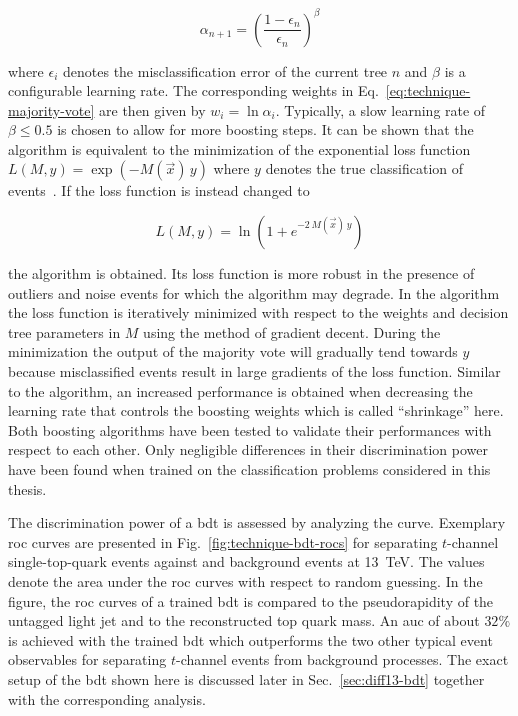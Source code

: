 \begin{equation}
\alpha_{n+1}=\left(\frac{1-\epsilon_{n}}{\epsilon_{n}}\right)^\beta
\end{equation}

where $\epsilon_{i}$ denotes the misclassification error of the current tree $n$ and $\beta$ is a configurable learning rate. The corresponding weights in Eq.~\ref{eq:technique-majority-vote} are then given by $w_{i}=\ln\alpha_{i}$. Typically, a slow learning rate of $\beta\leq0.5$ is chosen to allow for more boosting steps. It can be shown that the \ADABOOST algorithm is equivalent to the minimization of the exponential loss function $L(M,y)=\exp(-M(\vec{x})\,y)$ where $y$ denotes the true classification of events~\cite{Hocker:2007ht}. If the loss function is instead changed to 

\begin{equation}
L(M,y)=\ln\left(1+e^{-2\,M(\vec{x})\,y}\right)
\end{equation}

the \GRADIENTBOOST algorithm is obtained. Its loss function is more robust in the presence of outliers and noise events for which the \ADABOOST algorithm may degrade. In the \GRADIENTBOOST algorithm the loss function is iteratively minimized with respect to the weights and decision tree parameters in $M$ using the method of gradient decent. During the minimization the output of the majority vote will gradually tend towards $y$ because misclassified events result in large gradients of the loss function. Similar to the \ADABOOST algorithm, an increased performance is obtained when decreasing the learning rate that controls the boosting weights which is called ``shrinkage'' here. Both boosting algorithms have been tested to validate their performances with respect to each other. Only negligible differences in their discrimination power have been found when trained on the classification problems considered in this thesis.

The discrimination power of a \gls{bdt} is assessed by analyzing the  curve. Exemplary \gls{roc} curves are presented in Fig.~\ref{fig:technique-bdt-rocs} for separating $t$-channel single-top-quark events against \wjets and \ttbar background events at 13~TeV. The  values denote the area under the \gls{roc} curves with respect to random guessing. In the figure, the \gls{roc} curves of a trained \gls{bdt} is compared to the pseudorapidity of the untagged light jet and to the reconstructed top quark mass. An \gls{auc} of about $32\%$ is achieved with the trained \gls{bdt} which outperforms the two other typical event observables for separating $t$-channel events from background processes. The exact setup of the \gls{bdt} shown here is discussed later in Sec.~\ref{sec:diff13-bdt} together with the corresponding analysis.

